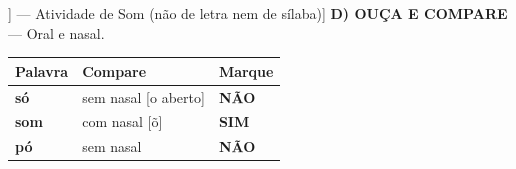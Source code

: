 \begin{exercicio}[Som /o/ nasal [[o~]] --- Atividade de Som (não de letra nem de sílaba)]
\textbf{D) OUÇA E COMPARE} --- Oral e nasal.

\begin{center}
\begin{tabular}{@{}p{4.2cm}p{6.2cm}p{1.6cm}@{}}
\hline
\textbf{Palavra} & \textbf{Compare} & \textbf{Marque} \\
\hline
\textbf{só} & sem nasal [o aberto] & \textbf{NÃO} \\
\textbf{som} & com nasal [õ] & \textbf{SIM} \\
\textbf{pó} & sem nasal & \textbf{NÃO} \\
\hline
\end{tabular}
\end{center}

\end{exercicio}

